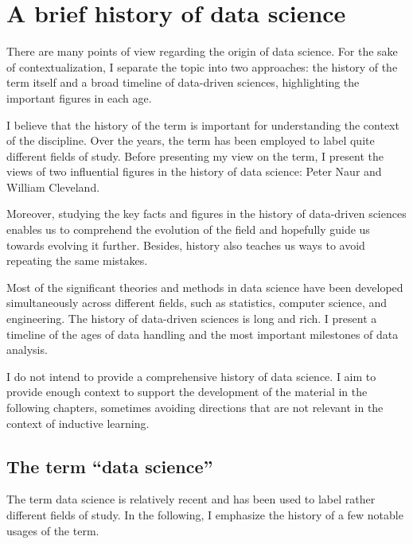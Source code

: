 \chapter{A brief history of data science}
\label{chap:history}

There are many points of view regarding the origin of data science.  For the sake of
contextualization, I separate the topic into two approaches: the history of the term itself
and a broad timeline of data-driven sciences, highlighting the important figures in each
age.

I believe that the history of the term is important for understanding the context of the
discipline. Over the years, the term has been employed to label quite different fields of
study.  Before presenting my view on the term, I present the views of two influential
figures in the history of data science: Peter Naur and William Cleveland.

Moreover, studying the key facts and figures in the history of data-driven sciences
enables us to comprehend the evolution of the field and hopefully guide us towards evolving it
further.  Besides, history also teaches us ways to avoid repeating the same mistakes.

Most of the significant theories and methods in data science have been developed
simultaneously across different fields, such as statistics, computer science, and engineering.
The history of data-driven sciences is long and rich. I present a timeline of the ages of
data handling and the most important milestones of data analysis.

I do not intend to provide a comprehensive history of data science.  I aim to provide
enough context to support the development of the material in the following chapters,
sometimes avoiding directions that are not relevant in the context of inductive learning.

\section{The term ``data science''}

The term data science is relatively recent and has been used to label rather different fields of
study.  In the following, I emphasize the history of a few notable usages of the term.

\def\naurds{(0,0) circle (20mm)}
\def\naurcs{(0:5mm) circle (15mm)}
\def\naurde{(0:40mm) circle (15mm)}


